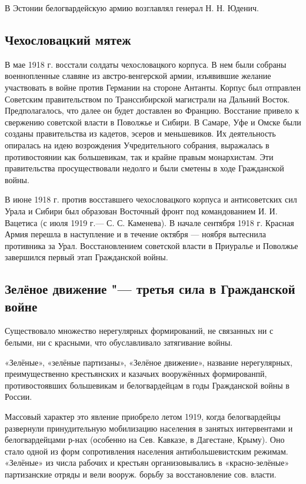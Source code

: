 В Эстонии белогвардейскую армию возглавлял генерал Н. Н. Юденич.

\subsection{Чехословацкий мятеж}

В мае 1918 г. восстали солдаты чехословацкого корпуса. В нем были собраны
военнопленные славяне из австро-венгерской армии, изъявившие желание участвовать в войне
против Германии на стороне Антанты. Корпус был отправлен Советским правительством по
Транссибирской магистрали на Дальний Восток. Предполагалось, что далее он будет доставлен
во Францию. Восстание привело к свержению советской власти в Поволжье и Сибири. В
Самаре, Уфе и Омске были созданы правительства из кадетов, эсеров и меньшевиков. Их
деятельность опиралась на идею возрождения Учредительного собрания, выражалась в
противостоянии как большевикам, так и крайне правым монархистам. Эти правительства
просуществовали недолго и были сметены в ходе Гражданской войны.

В июне 1918 г. против восставшего чехословацкого корпуса и антисоветских сил Урала и
Сибири был образован Восточный фронт под командованием И. И. Вацетиса (с июля 1919 г.—
С. С. Каменева). В начале сентября 1918 г. Красная Армия перешла в наступление и в течение
октября — ноября вытеснила противника за Урал. Восстановлением советской власти в
Приуралье и Поволжье завершился первый этап Гражданской войны.

\subsection{Зелёное движение "--- третья сила в Гражданской войне}

Существовало множество нерегулярных формирований, не связанных ни с белыми, ни с красными, что обуславливало затягивание войны.

«Зелёные», «зелёные партизаны», «Зелёное движение», название нерегулярных, преимущественно крестьянских и казачьих вооружённых формированпй, противостоявших большевикам и белогвардейцам в годы Гражданской войны в России.

Массовый характер это явление приобрело летом 1919, когда белогвардейцы развернули принудительную мобилизацию населения в занятых интервентами и белогвардейцами р-нах (особенно на Сев. Кавказе, в Дагестане, Крыму).
Оно стало одной из форм сопротивления населения антибольшевистским режимам.
«Зелёные» из числа рабочих и крестьян организовывались в «красно-зелёные» партизанские отряды и вели вооруж. борьбу за восстановление сов. власти.

